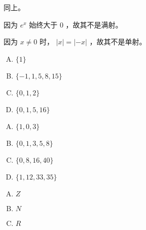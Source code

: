 {{        %
        \begin{practices}
            同上。
        \end{practices}

        \begin{practices}
            因为 $e^x$ 始终大于 $0$ ，故其不是满射。
        \end{practices}

        \begin{practices}
            因为 $x \neq 0$ 时， $|x| = |-x|$ ，故其不是单射。
        \end{practices}

        \begin{practices}
            \begin{enumerate}[A.]
                \item $\{1\}$
                \item $\{-1, 1, 5, 8, 15\}$
                \item $\{0, 1, 2\}$
                \item $\{0, 1, 5, 16\}$
            \end{enumerate}
        \end{practices}

        \begin{practices}
            \begin{enumerate}[A.]
                \item $\{1, 0, 3\}$
                \item $\{0, 1, 3, 5, 8\}$
                \item $\{0, 8, 16, 40\}$
                \item $\{1, 12, 33, 35\}$
            \end{enumerate}
        \end{practices}

        \begin{practices}
            \begin{enumerate}[A.]
                \item $Z$
                \item $N$
                \item $R$
            \end{enumerate}
        \end{practices}

}}
